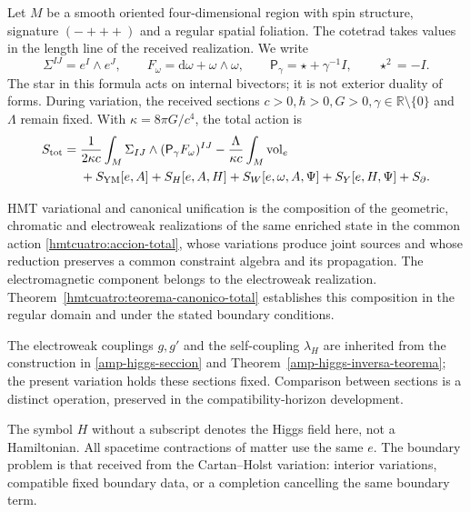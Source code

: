 Let \(M\) be a smooth oriented four-dimensional region with spin structure, signature \((-+++)\) and a regular spatial foliation. The cotetrad takes values in the length line of the received realization. We write
\[
 \Sigma^{IJ}=e^I\wedge e^J,\qquad
 F_\omega=\mathrm d\omega+\omega\wedge\omega,\qquad
 \mathsf P_\gamma=\star+\gamma^{-1}I,\qquad \star^2=-I.
\]
The star in this formula acts on internal bivectors; it is not exterior duality of forms. During variation, the received sections \(c>0,\hbar>0,G>0,\gamma\in\mathbb R\setminus\{0\}\) and \(\Lambda\) remain fixed. With \(\kappa=8\pi G/c^4\), the total action is
\begin{equation}
 \begin{split}
 S_{\rm tot}={}&\frac1{2\kappa c}
   \int_M\Sigma_{IJ}\wedge(\mathsf P_\gamma F_\omega)^{IJ}
 -\frac{\Lambda}{\kappa c}\int_M\operatorname{vol}_e\\
 &+S_{\rm YM}[e,A]+S_H[e,A,H]
   +S_W[e,\omega,A,\Psi]+S_Y[e,H,\Psi]+S_{\partial}.
 \end{split}
 \label{hmtcuatro:accion-total}
\end{equation}

\begin{definition}
\label{hmtcuatro:def-unificacion}
HMT variational and canonical unification is the composition of the geometric, chromatic and electroweak realizations of the same enriched state in the common action \eqref{hmtcuatro:accion-total}, whose variations produce joint sources and whose reduction preserves a common constraint algebra and its propagation. The electromagnetic component belongs to the electroweak realization. Theorem~\ref{hmtcuatro:teorema-canonico-total} establishes this composition in the regular domain and under the stated boundary conditions.
\end{definition}
The electroweak couplings $g,g'$ and the self-coupling $\lambda_H$ are inherited from the construction in \ref{amp-higgs-seccion} and Theorem~\ref{amp-higgs-inversa-teorema}; the present variation holds these sections fixed. Comparison between sections is a distinct operation, preserved in the compatibility-horizon development.


The symbol \(H\) without a subscript denotes the Higgs field here, not a Hamiltonian. All spacetime contractions of matter use the same \(e\). The boundary problem is that received from the Cartan--Holst variation: interior variations, compatible fixed boundary data, or a completion cancelling the same boundary term.

